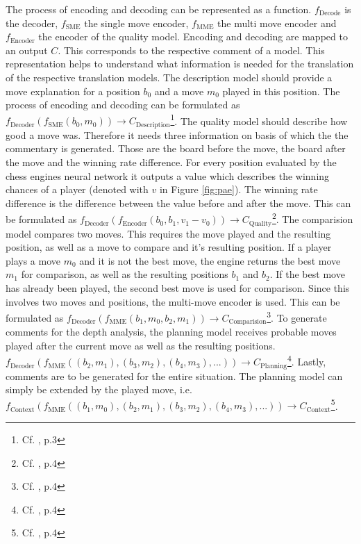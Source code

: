 The process of encoding and decoding can be represented as a function. $f_{\text{Decode}}$ is the decoder, $f_{\text{SME}}$ the single move encoder, $f_{\text{MME}}$ the multi move encoder and $f_{\text{Encoder}}$ the encoder of the quality model. Encoding and decoding are mapped to an output $C$. This corresponds to the respective comment of a model. This representation helps to understand what information is needed for the translation of the respective translation models. The description model should provide a move explanation for a position $b_0$ and a move $m_0$ played in this position. The process of encoding and decoding can be formulated as $f_{\text{Decoder}}(f_{\text{SME}}(b_0,m_0)) \rightarrow C_{\text{Description}}$\footnote{Cf. \citep{zang-etal-2019-automated}, p.3}. The quality model should describe how good a move was. Therefore it needs three information on basis of which the the commentary is generated. Those are the board before the move, the board after the move and the winning rate difference. For every position evaluated by the chess engines neural network it outputs a value which describes the winning chances of a player (denoted with $v$ in Figure \ref{fig:pae}). The winning rate difference is the difference between the value before and after the move. This can be formulated as $f_{\text{Decoder}}(f_{\text{Encoder}}(b_0,b_1,v_1-v_0)) \rightarrow C_{\text{Quality}}$\footnote{Cf. \citep{zang-etal-2019-automated}, p.4}. The comparision model compares two moves. This requires the move played and the resulting position, as well as a move to compare and it's resulting position. If a player plays a move $m_0$ and it is not the best move, the engine returns the best move $m_1$ for comparison, as well as the resulting positions $b_1$ and $b_2$. If the best move has already been played, the second best move is used for comparison. Since this involves two moves and positions, the multi-move encoder is used. This can be formulated as $f_{\text{Decoder}}(f_{\text{MME}}(b_1,m_0,b_2,m_1)) \rightarrow C_{\text{Comparision}}$\footnote{Cf. \citep{zang-etal-2019-automated}, p.4}. To generate comments for the depth analysis, the planning model receives probable moves played after the current move as well as the resulting positions. $f_{\text{Decoder}}(f_{\text{MME}}((b_2,m_1),(b_3,m_2),(b_4,m_3),...)) \rightarrow C_{\text{Planning}}$\footnote{Cf. \citep{zang-etal-2019-automated}, p.4}. Lastly, comments are to be generated for the entire situation. The planning model can simply be extended by the played move, i.e. $f_{\text{Context}}(f_{\text{MME}}((b_1,m_0),(b_2,m_1),(b_3,m_2),(b_4,m_3),...)) \rightarrow C_{\text{Context}}$\footnote{Cf. \citep{zang-etal-2019-automated}, p.4}.

